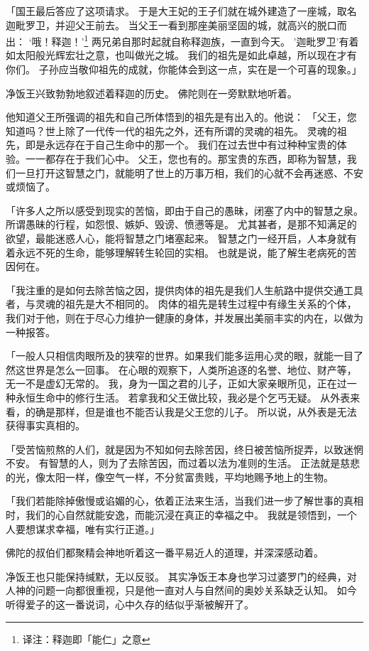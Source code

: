 \documentclass[twoside,openany]{book}
\begin{document}
「国王最后答应了这项请求。
于是大王妃的王子们就在城外建造了一座城，取名迦毗罗卫，并迎父王前去。
当父王一看到那座美丽坚固的城，就高兴的脱口而出：
‘哦！释迦！’\footnote{译注：释迦即「能仁」之意}
两兄弟自那时起就自称释迦族，一直到今天。
'迦毗罗卫'有着如太阳般光辉宏壮之意，也叫做光之城。
我们的祖先是如此卓越，所以现在才有你们。
子孙应当敬仰祖先的成就，你能体会到这一点，实在是一个可喜的现象。」

净饭王兴致勃勃地叙述着释迦的历史。
佛陀则在一旁默默地听着。

他知道父王所强调的祖先和自己所体悟到的祖先是有出入的。他说：
「父王，您知道吗？世上除了一代传一代的祖先之外，还有所谓的灵魂的祖先。
灵魂的祖先，即是永远存在于自己生命中的那一个。
我们在过去世中有过种种宝贵的体验。一一都存在于我们心中。
父王，您也有的。那宝贵的东西，即称为智慧，我们一旦打开这智慧之门，就能明了世上的万事万相，我们的心就不会再迷惑、不安或烦恼了。

「许多人之所以感受到现实的苦恼，即由于自己的愚昧，闭塞了内中的智慧之泉。
所谓愚昧的行程，如怨恨、嫉妒、毁谤、愤懑等是。
尤其甚者，是那不知满足的欲望，最能迷惑人心，能将智慧之门堵塞起来。
智慧之门一经开启，人本身就有着永远不死的生命，能够理解转生轮回的实相。
也就是说，能了解生老病死的苦因何在。

「我注重的是如何去除苦恼之因，提供肉体的祖先是我们人生航路中提供交通工具者，与灵魂的祖先是大不相同的。
肉体的祖先是转生过程中有缘生关系的个体，我们对于他，则在于尽心力维护一健康的身体，并发展出美丽丰实的内在，以做为一种报答。

「一般人只相信肉眼所及的狭窄的世界。如果我们能多运用心灵的眼，就能一目了然这世界是怎么一回事。
在心眼的观察下，人类所追逐的名誉、地位、财产等，无一不是虚幻无常的。
我，身为一国之君的儿子，正如大家亲眼所见，正在过一种永恒生命中的修行生活。
若拿我和父王做比较，我必是个乞丐无疑。
从外表来看，的确是那样，但是谁也不能否认我是父王您的儿子。
所以说，从外表是无法获得事实真相的。

「受苦恼煎熬的人们，就是因为不知如何去除苦因，终日被苦恼所捉弄，以致迷惘不安。
有智慧的人，则为了去除苦因，而过着以法为准则的生活。
正法就是慈悲的光，像太阳一样，像空气一样，不分贫富贵贱，平均地赐予地上的生物。

「我们若能除掉傲慢或谄媚的心，依着正法来生活，当我们进一步了解世事的真相时，我们的心自然就能安逸，而能沉浸在真正的幸福之中。
我就是领悟到，一个人要想谋求幸福，唯有实行正道。」

佛陀的叔伯们都聚精会神地听着这一番平易近人的道理，并深深感动着。

净饭王也只能保持缄默，无以反驳。
其实净饭王本身也学习过婆罗门的经典，对人神的问题一向都很重视，只是他一直对人与自然间的奥妙关系缺乏认知。
如今听得爱子的这一番说词，心中久存的结似乎渐被解开了。
\end{document}
